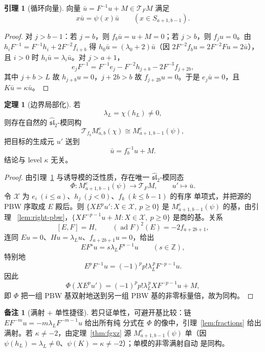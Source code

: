 \documentclass[UTF8,11pt]{ctexart}
\newcommand{\Z}{\mathbb Z}
\newcommand{\slh}{\widehat{\mathfrak{sl}}_2}
\newcommand{\ad}{\operatorname{ad}}
\newcommand{\X}{\mathcal X}
\newcommand{\T}{\mathcal T}
\theoremstyle{definition}
\newtheorem{lemma}[proposition]{引理}
\newtheorem{theorem}[proposition]{定理}
\newtheorem{remark}[proposition]{备注}
\begin{document}
\begin{lemma}[循环向量]\label{lem:cyc}
向量 \(\bar u=F^{-1}u+M\in\T_FM\) 满足
\[
x\bar u=\psi(x)\bar u\qquad(x\in S_{a+1,b-1}).
\]
\end{lemma}

\begin{proof}
对 \(j>b-1\)：若 \(j=b\)，则 \(f_b\bar u=u+M=0\)；若 \(j>b\)，则
\(f_ju=0\)。由 \(h_iF^{-1}=F^{-1}h_i+2F^{-2}f_{i+b}\) 得
\(h_0\bar u=(\lambda_0+2)\bar u\)（因 \(2F^{-2}f_bu=2F^{-2}Fu=2\bar u\)），
且 \(i>0\) 时 \(h_i\bar u=\lambda_i\bar u\)。对 \(j>a+1\)，
\[
e_jF^{-1}=F^{-1}e_j-F^{-2}h_{j+b}-2F^{-3}f_{j+2b},
\]
其中 \(j+b>L\) 故 \(h_{j+b}u=0\)，\(j+2b>b\) 故 \(f_{j+2b}u=0\)。于是
\(e_j\bar u=0\)，且 \(K\bar u=\kappa\bar u\)。
\end{proof}

\begin{theorem}[边界局部化]\label{thm:boundary}
若
\[
\lambda_L=\chi(h_L)\ne0,
\]
则存在自然的 \(\slh\)-模同构
\[
\boxed{\ \T_{f_b}M^c_{a,b}(\chi)\cong M^c_{a+1,b-1}(\psi),\ }
\]
把目标的生成元 \(u'\) 送到
\[
\bar u=f_b^{-1}u+M.
\]
结论与 level \(\kappa\) 无关。
\end{theorem}

\begin{proof}
由引理~\ref{lem:cyc} 与诱导模的泛性质，存在唯一 \(\slh\)-模同态
\[
\Phi:M^c_{a+1,b-1}(\psi)\longrightarrow\T_FM,
\qquad u'\longmapsto\bar u.
\]
令 \(\X\) 为 \(e_i\ (i\le a)\)、\(h_j\ (j<0)\)、\(f_k\ (k\le b-1)\) 的有序
单项式，并把源的 PBW 序取成 \(E\) 殿后。则
\(\{XE^pu':X\in\X,\ p\ge0\}\) 是 \(M^c_{a+1,b-1}(\psi)\) 的基，由引理
~\ref{lem:right-pbw}，\(\{XF^{-p-1}u+M:X\in\X,\ p\ge0\}\) 是商的基。关系
\[
[E,F]=H,\qquad (\ad F)^2(E)=-2f_{a+2b+1},
\]
连同 \(Eu=0\)、\(Hu=\lambda_Lu\)、\(f_{a+2b+1}u=0\)，给出
\[
EF^su=s\lambda_LF^{s-1}u\qquad(s\in\Z),
\]
特别地
\[
E^pF^{-1}u=(-1)^pp!\lambda_L^{\,p}F^{-p-1}u.
\]
因此
\[
\Phi(XE^pu')=(-1)^pp!\lambda_L^{\,p}XF^{-p-1}u+M,
\]
即 \(\Phi\) 把一组 PBW 基双射地送到另一组 PBW 基的非零标量倍，故为同构。
\end{proof}

\begin{remark}[满射 + 单性捷径]\label{rem:shortcut}
若只证单性，可避开基比较：链 \(EF^{-m}u=-m\lambda_LF^{-m-1}u\) 给出所有纯
分式在 \(\Phi\) 的像中，引理~\ref{lem:fractions} 给出满射。若
\(\kappa\ne-2\)，由定理~\ref{thm:fgxz} 源 \(M^c_{a+1,b-1}(\psi)\) 单（因
\(\psi(h_L)=\lambda_L\ne0\)、\(\psi(K)=\kappa\ne-2\)）；单模的非零满射自动
是同构。
\end{remark}
\end{document}
